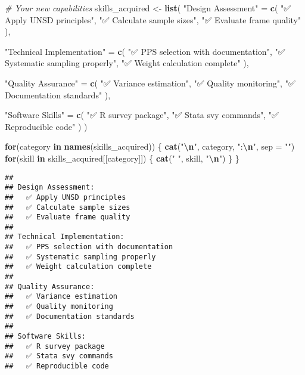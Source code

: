 \documentclass[
]{article}
\newenvironment{Shaded}{\begin{snugshade}}{\end{snugshade}}
\newcommand{\AttributeTok}[1]{\textcolor[rgb]{0.13,0.29,0.53}{#1}}
\newcommand{\CommentTok}[1]{\textcolor[rgb]{0.56,0.35,0.01}{\textit{#1}}}
\newcommand{\ControlFlowTok}[1]{\textcolor[rgb]{0.13,0.29,0.53}{\textbf{#1}}}
\newcommand{\FunctionTok}[1]{\textcolor[rgb]{0.13,0.29,0.53}{\textbf{#1}}}
\newcommand{\NormalTok}[1]{#1}
\newcommand{\OtherTok}[1]{\textcolor[rgb]{0.56,0.35,0.01}{#1}}
\newcommand{\SpecialCharTok}[1]{\textcolor[rgb]{0.81,0.36,0.00}{\textbf{#1}}}
\newcommand{\StringTok}[1]{\textcolor[rgb]{0.31,0.60,0.02}{#1}}
\begin{document}
\begin{Shaded}
\begin{Highlighting}[]
\CommentTok{\# Your new capabilities}
\NormalTok{skills\_acquired }\OtherTok{\textless{}{-}} \FunctionTok{list}\NormalTok{(}
  \StringTok{"Design Assessment"} \OtherTok{=} \FunctionTok{c}\NormalTok{(}
    \StringTok{"✅ Apply UNSD principles"}\NormalTok{,}
    \StringTok{"✅ Calculate sample sizes"}\NormalTok{,}
    \StringTok{"✅ Evaluate frame quality"}
\NormalTok{  ),}
  
  \StringTok{"Technical Implementation"} \OtherTok{=} \FunctionTok{c}\NormalTok{(}
    \StringTok{"✅ PPS selection with documentation"}\NormalTok{,}
    \StringTok{"✅ Systematic sampling properly"}\NormalTok{,}
    \StringTok{"✅ Weight calculation complete"}
\NormalTok{  ),}
  
  \StringTok{"Quality Assurance"} \OtherTok{=} \FunctionTok{c}\NormalTok{(}
    \StringTok{"✅ Variance estimation"}\NormalTok{,}
    \StringTok{"✅ Quality monitoring"}\NormalTok{,}
    \StringTok{"✅ Documentation standards"}
\NormalTok{  ),}
  
  \StringTok{"Software Skills"} \OtherTok{=} \FunctionTok{c}\NormalTok{(}
    \StringTok{"✅ R survey package"}\NormalTok{,}
    \StringTok{"✅ Stata svy commands"}\NormalTok{,}
    \StringTok{"✅ Reproducible code"}
\NormalTok{  )}
\NormalTok{)}

\ControlFlowTok{for}\NormalTok{(category }\ControlFlowTok{in} \FunctionTok{names}\NormalTok{(skills\_acquired)) \{}
  \FunctionTok{cat}\NormalTok{(}\StringTok{"}\SpecialCharTok{\textbackslash{}n}\StringTok{"}\NormalTok{, category, }\StringTok{":}\SpecialCharTok{\textbackslash{}n}\StringTok{"}\NormalTok{, }\AttributeTok{sep =} \StringTok{""}\NormalTok{)}
  \ControlFlowTok{for}\NormalTok{(skill }\ControlFlowTok{in}\NormalTok{ skills\_acquired[[category]]) \{}
    \FunctionTok{cat}\NormalTok{(}\StringTok{" "}\NormalTok{, skill, }\StringTok{"}\SpecialCharTok{\textbackslash{}n}\StringTok{"}\NormalTok{)}
\NormalTok{  \}}
\NormalTok{\}}
\end{Highlighting}
\end{Shaded}

\begin{verbatim}
## 
## Design Assessment:
##   ✅ Apply UNSD principles 
##   ✅ Calculate sample sizes 
##   ✅ Evaluate frame quality 
## 
## Technical Implementation:
##   ✅ PPS selection with documentation 
##   ✅ Systematic sampling properly 
##   ✅ Weight calculation complete 
## 
## Quality Assurance:
##   ✅ Variance estimation 
##   ✅ Quality monitoring 
##   ✅ Documentation standards 
## 
## Software Skills:
##   ✅ R survey package 
##   ✅ Stata svy commands 
##   ✅ Reproducible code
\end{verbatim}
\end{document}

